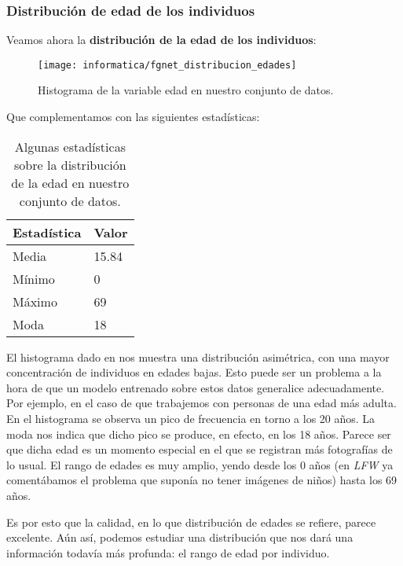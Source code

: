 \subsubsection{Distribución de edad de los individuos} \label{isubsubs:fgnet_dist_edades}

Veamos ahora la \textbf{distribución de la edad de los individuos}:

\begin{figure}[!hbtp]
    \centering
    \texttt{[image: informatica/fgnet\_distribucion\_edades]}
    \caption{Histograma de la variable edad en nuestro conjunto de datos.}
    \label{img:fgnet_histograma_edad}
\end{figure}

Que complementamos con las siguientes estadísticas:

\begin{table}[!hbtp]
\centering
\begin{tabular}{|l|l|}
    \hline
    \textbf{Estadística} & \textbf{Valor} \\
    \hline

    Media  & 15.84 \\
    Mínimo & 0 \\
    Máximo & 69 \\
    Moda   & 18 \\

    \hline

\end{tabular}

    \caption{Algunas estadísticas sobre la distribución de la edad en nuestro conjunto de datos.}
    \label{table:fgnet_estadisticas_edad}
\end{table}

El histograma dado en  nos muestra una distribución asimétrica, con una mayor concentración de individuos en edades bajas. Esto puede ser un problema a la hora de que un modelo entrenado sobre estos datos generalice adecuadamente. Por ejemplo, en el caso de que trabajemos con personas de una edad más adulta. En el histograma se observa un pico de frecuencia en torno a los 20 años. La moda nos indica que dicho pico se produce, en efecto, en los 18 años. Parece ser que dicha edad es un momento especial en el que se registran más fotografías de lo usual. El rango de edades es muy amplio, yendo desde los 0 años (en \textit{LFW} ya comentábamos el problema que suponía no tener imágenes de niños) hasta los 69 años.

Es por esto que la calidad, en lo que distribución de edades se refiere, parece excelente. Aún así, podemos estudiar una distribución que nos dará una información todavía más profunda: el rango de edad por individuo.

